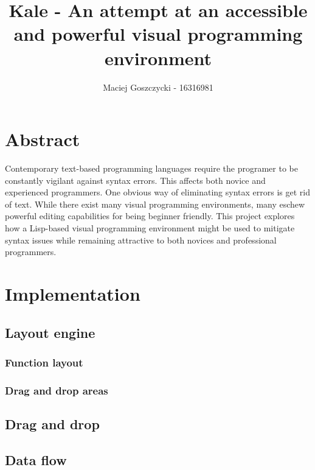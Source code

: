 \documentclass[11pt]{report}
\title{Kale - An attempt at an accessible and powerful visual programming
environment}
\author{Maciej Goszczycki - 16316981}
\date{}
\begin{document}
\maketitle
\newcommand{\ak}[1]{\keys{\arrowkey{#1}}}
\tableofcontents
\clearpage

\begingroup
\let\clearpage\relax

\chapter{Abstract}
Contemporary text-based programming languages require the programer to be
constantly vigilant against syntax errors. This affects both novice and
experienced programmers. One obvious way of eliminating syntax errors is
get rid of text. While there exist many visual programming environments, many
eschew powerful editing capabilities for being beginner friendly.
This project explores how a Lisp-based visual programming environment might be
used to mitigate syntax issues while remaining attractive to both novices and
professional programmers.









\chapter{Implementation}

\section{Layout engine}
\subsection{Function layout}
\subsection{Drag and drop areas}
\section{Drag and drop}
\section{Data flow}
\end{document}
